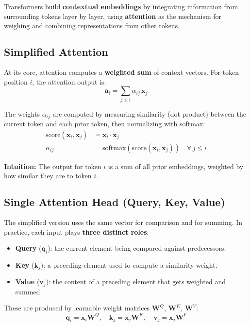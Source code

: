 \documentclass[main.tex]{subfiles}
\begin{document}
Transformers build \textbf{contextual embeddings} by integrating information from surrounding tokens layer by layer, using \textbf{attention} as the mechanism for weighing and combining representations from other tokens.

\subsection{Simplified Attention}

At its core, attention computes a \textbf{weighted sum} of context vectors. For token position $i$, the attention output is:
$$\mathbf{a}_i = \sum_{j \leq i} \alpha_{ij} \, \mathbf{x}_j \tag{8.6}$$

The weights $\alpha_{ij}$ are computed by measuring similarity (dot product) between the current token and each prior token, then normalizing with softmax:
\begin{align}
\text{score}(\mathbf{x}_i, \mathbf{x}_j) &= \mathbf{x}_i \cdot \mathbf{x}_j \tag{8.7} \\[6pt]
\alpha_{ij} &= \text{softmax}\left(\text{score}(\mathbf{x}_i, \mathbf{x}_j)\right) \quad \forall\, j \leq i \tag{8.8}
\end{align}

\textbf{Intuition:} The output for token $i$ is a sum of all prior embeddings, weighted by how similar they are to token $i$.

\subsection{Single Attention Head (Query, Key, Value)}

The simplified version uses the same vector for comparison and for summing. In practice, each input plays \textbf{three distinct roles}:

\begin{itemize}
    \item \textbf{Query} ($\mathbf{q}_i$): the current element being compared against predecessors.
    \item \textbf{Key} ($\mathbf{k}_j$): a preceding element used to compute a similarity weight.
    \item \textbf{Value} ($\mathbf{v}_j$): the content of a preceding element that gets weighted and summed.
\end{itemize}

These are produced by learnable weight matrices $\mathbf{W}^Q$, $\mathbf{W}^K$, $\mathbf{W}^V$:
$$\mathbf{q}_i = \mathbf{x}_i \mathbf{W}^Q, \quad \mathbf{k}_j = \mathbf{x}_j \mathbf{W}^K, \quad \mathbf{v}_j = \mathbf{x}_j \mathbf{W}^V \tag{8.9}$$
\end{document}
